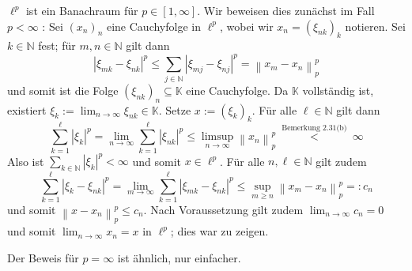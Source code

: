 \documentclass[10pt, letterpaper]{article}
\begin{document}
$\ell^{p}$ ist ein Banachraum für $p \in[1, \infty]$. Wir beweisen dies zunächst im Fall $p<\infty$ : Sei $\left(x_{n}\right)_{n}$ eine Cauchyfolge in $\ell^{p}$, wobei wir $x_{n}=\left(\xi_{n k}\right)_{k}$ notieren. Sei $k \in \mathbb{N}$ fest; für $m, n \in \mathbb{N}$ gilt dann
$$
\left|\xi_{m k}-\xi_{n k}\right|^{p} \leq \sum_{j \in \mathbb{N}}\left|\xi_{m j}-\xi_{n j}\right|^{p}=\left\|x_{m}-x_{n}\right\|_{p}^{p}
$$
und somit ist die Folge $\left(\xi_{n k}\right)_{n} \subseteq \mathbb{K}$ eine Cauchyfolge. Da $\mathbb{K}$ vollständig ist, existiert $\xi_{k}:=\lim _{n \rightarrow \infty} \xi_{n k} \in \mathbb{K}$. Setze $x:=\left(\xi_{k}\right)_{k}$. Für alle $\ell \in \mathbb{N}$ gilt dann
$$
\sum_{k=1}^{\ell}\left|\xi_{k}\right|^{p}=\lim _{n \rightarrow \infty} \sum_{k=1}^{\ell}\left|\xi_{n k}\right|^{p} \leq \limsup _{n \rightarrow \infty}\left\|x_{n}\right\|_{p}^{p} \stackrel{\text { Bemerkung 2.31(b) }}{<} \infty
$$
Also ist $\sum_{k \in \mathbb{N}}\left|\xi_{k}\right|^{p}<\infty$ und somit $x \in \ell^{p}$. Für alle $n, \ell \in \mathbb{N}$ gilt zudem
$$
\sum_{k=1}^{\ell}\left|\xi_{k}-\xi_{n k}\right|^{p}=\lim _{m \rightarrow \infty} \sum_{k=1}^{\ell}\left|\xi_{m k}-\xi_{n k}\right|^{p} \leq \sup _{m \geq n}\left\|x_{m}-x_{n}\right\|_{p}^{p}=: c_{n}
$$
und somit $\left\|x-x_{n}\right\|_{p}^{p} \leq c_{n}$. Nach Voraussetzung gilt zudem $\lim _{n \rightarrow \infty} c_{n}=0$ und somit $\lim _{n \rightarrow \infty} x_{n}=x$ in $\ell^{p}$; dies war zu zeigen. 

Der Beweis für $p=\infty$ ist ähnlich, nur einfacher. 
\end{document}
